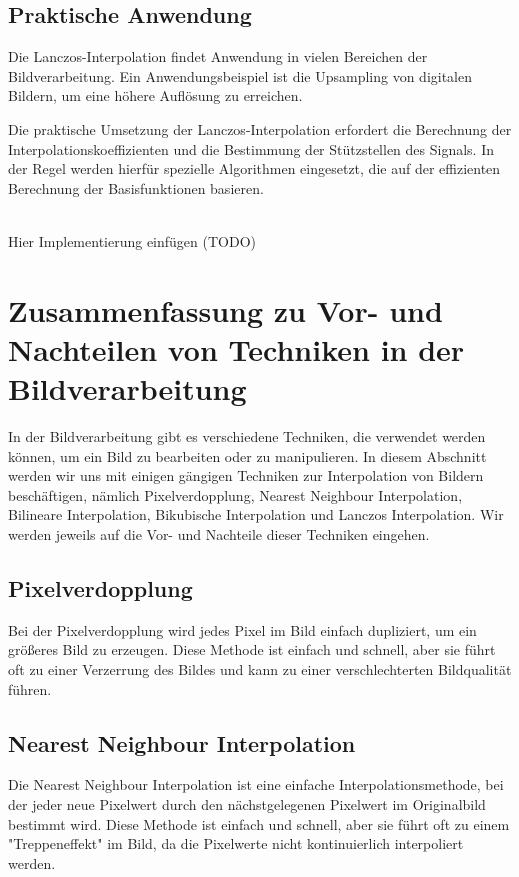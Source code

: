 \subsection{Praktische Anwendung}

Die Lanczos-Interpolation findet Anwendung in vielen Bereichen der Bildverarbeitung. 
Ein Anwendungsbeispiel ist die Upsampling von digitalen Bildern, um eine höhere Auflösung zu erreichen.

Die praktische Umsetzung der Lanczos-Interpolation erfordert die Berechnung der Interpolationskoeffizienten und die Bestimmung der Stützstellen des Signals. 
In der Regel werden hierfür spezielle Algorithmen eingesetzt, die auf der effizienten Berechnung der Basisfunktionen basieren.

\\Hier Implementierung einfügen (TODO) 

\section{Zusammenfassung zu Vor- und Nachteilen von Techniken in der Bildverarbeitung}

In der Bildverarbeitung gibt es verschiedene Techniken, die verwendet werden können, um ein Bild zu bearbeiten oder zu manipulieren. 
In diesem Abschnitt werden wir uns mit einigen gängigen Techniken zur Interpolation von Bildern beschäftigen, nämlich Pixelverdopplung, Nearest Neighbour Interpolation, Bilineare Interpolation, Bikubische Interpolation und Lanczos Interpolation. 
Wir werden jeweils auf die Vor- und Nachteile dieser Techniken eingehen.

\subsection{Pixelverdopplung}

Bei der Pixelverdopplung wird jedes Pixel im Bild einfach dupliziert, um ein größeres Bild zu erzeugen. 
Diese Methode ist einfach und schnell, aber sie führt oft zu einer Verzerrung des Bildes und kann zu einer verschlechterten Bildqualität führen.

\subsection{Nearest Neighbour Interpolation}

Die Nearest Neighbour Interpolation ist eine einfache Interpolationsmethode, bei der jeder neue Pixelwert durch den nächstgelegenen Pixelwert im Originalbild bestimmt wird. 
Diese Methode ist einfach und schnell, aber sie führt oft zu einem "Treppeneffekt" im Bild, da die Pixelwerte nicht kontinuierlich interpoliert werden.

